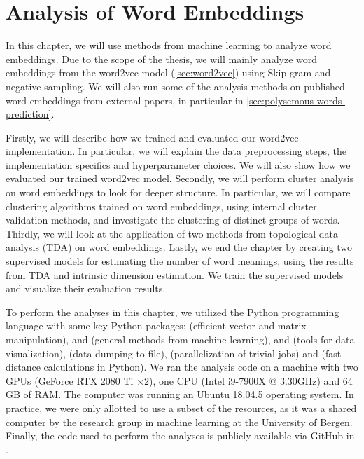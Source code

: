 \chapter{Analysis of Word Embeddings}
\label{chap:analysis-of-word-embeddings}
In this chapter, we will use methods from machine learning to analyze word embeddings. Due to the scope of the thesis, we will mainly analyze word embeddings from the word2vec model (\cref{sec:word2vec}) using Skip-gram and negative sampling. We will also run some of the analysis methods on published word embeddings from external papers, in particular in \cref{sec:polysemous-words-prediction}.

Firstly, we will describe how we trained and evaluated our word2vec implementation. In particular, we will explain the data preprocessing steps, the implementation specifics and hyperparameter choices. We will also show how we evaluated our trained word2vec model. Secondly, we will perform cluster analysis on word embeddings to look for deeper structure. In particular, we will compare clustering algorithms trained on word embeddings, using internal cluster validation methods, and investigate the clustering of distinct groups of words. Thirdly, we will look at the application of two methods from topological data analysis (TDA) on word embeddings. Lastly, we end the chapter by creating two supervised models for estimating the number of word meanings, using the results from TDA and intrinsic dimension estimation. We train the supervised models and visualize their evaluation results.

To perform the analyses in this chapter, we utilized the Python programming language with some key Python packages:  \cite{2020NumPy-Array} (efficient vector and matrix manipulation),  \cite{ScikitLearn2011} and  \cite{2020SciPy-NMeth} (general methods from machine learning),  \cite{Matplotlib2007} and  \cite{seaborn2021} (tools for data visualization),  \cite{joblib2021} (data dumping to file),  \cite{sharedmem2020} (parallelization of trivial jobs) and  \cite{fastdist2021} (fast distance calculations in Python). We ran the analysis code on a machine with two GPUs (GeForce RTX 2080 Ti $\times2$), one CPU (Intel i9-7900X @ 3.30GHz) and 64 GB of RAM. The computer was running an Ubuntu 18.04.5 operating system. In practice, we were only allotted to use a subset of the resources, as it was a shared computer by the research group in machine learning at the University of Bergen. Finally, the code used to perform the analyses is publicly available via GitHub in \cite{Triki2021}.



